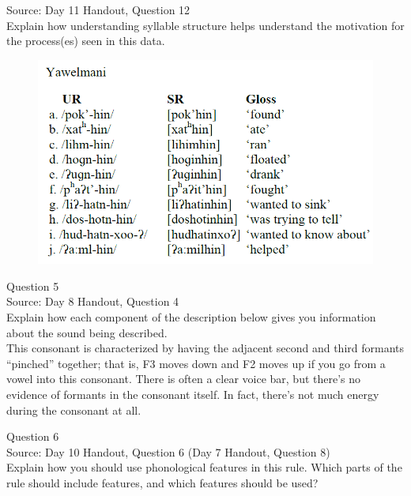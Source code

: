\documentclass[12pt]{article}
\begin{document}
Source: Day 11 Handout, Question 12\\

Explain how understanding syllable structure helps understand the motivation for the process(es) seen in this data.\\

\begin{figure}[H]
\includegraphics{../images/yawelmani.png}
\end{figure}

\newpage

{\large Question 5}\\

Source: Day 8 Handout, Question 4\\

Explain how each component of the description below gives you information about the sound being described.\\

This consonant is characterized by having the adjacent second and third formants ``pinched'' together; that is, F3 moves down and F2 moves up if you go from a vowel into this consonant. There is often a clear voice bar, but there’s no evidence of formants in the consonant itself. In fact, there’s not much energy during the consonant at all.


\newpage

{\large Question 6}\\

Source: Day 10 Handout, Question 6 (Day 7 Handout, Question 8)\\

Explain how you should use phonological features in this rule. Which parts of the rule should include features, and which features should be used?\\
\end{document}
